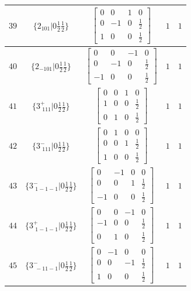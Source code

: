 \documentclass[fleqn,8pt]{jsarticle}
\begin{document}
\begin{longtable}{ccccc}
$ 39 $ & $ \{2{}_{101}|0 \frac{1}{2} \frac{1}{2}\} $ & $ \begin{bmatrix} 0 & 0 & 1 & 0 \\ 0 & -1 & 0 & \frac{1}{2} \\ 1 & 0 & 0 & \frac{1}{2} \end{bmatrix} $ & $ 1 $ & $ 1 $ \\ \hline
$ 40 $ & $ \{2{}_{-101}|0 \frac{1}{2} \frac{1}{2}\} $ & $ \begin{bmatrix} 0 & 0 & -1 & 0 \\ 0 & -1 & 0 & \frac{1}{2} \\ -1 & 0 & 0 & \frac{1}{2} \end{bmatrix} $ & $ 1 $ & $ 1 $ \\ \hline
$ 41 $ & $ \{3^{+}_{\,\,111}|0 \frac{1}{2} \frac{1}{2}\} $ & $ \begin{bmatrix} 0 & 0 & 1 & 0 \\ 1 & 0 & 0 & \frac{1}{2} \\ 0 & 1 & 0 & \frac{1}{2} \end{bmatrix} $ & $ 1 $ & $ 1 $ \\ \hline
$ 42 $ & $ \{3^{-}_{\,\,111}|0 \frac{1}{2} \frac{1}{2}\} $ & $ \begin{bmatrix} 0 & 1 & 0 & 0 \\ 0 & 0 & 1 & \frac{1}{2} \\ 1 & 0 & 0 & \frac{1}{2} \end{bmatrix} $ & $ 1 $ & $ 1 $ \\ \hline
$ 43 $ & $ \{3^{-}_{\,\,1-1-1}|0 \frac{1}{2} \frac{1}{2}\} $ & $ \begin{bmatrix} 0 & -1 & 0 & 0 \\ 0 & 0 & 1 & \frac{1}{2} \\ -1 & 0 & 0 & \frac{1}{2} \end{bmatrix} $ & $ 1 $ & $ 1 $ \\ \hline
$ 44 $ & $ \{3^{+}_{\,\,1-1-1}|0 \frac{1}{2} \frac{1}{2}\} $ & $ \begin{bmatrix} 0 & 0 & -1 & 0 \\ -1 & 0 & 0 & \frac{1}{2} \\ 0 & 1 & 0 & \frac{1}{2} \end{bmatrix} $ & $ 1 $ & $ 1 $ \\ \hline
$ 45 $ & $ \{3^{-}_{\,\,-11-1}|0 \frac{1}{2} \frac{1}{2}\} $ & $ \begin{bmatrix} 0 & -1 & 0 & 0 \\ 0 & 0 & -1 & \frac{1}{2} \\ 1 & 0 & 0 & \frac{1}{2} \end{bmatrix} $ & $ 1 $ & $ 1 $ \\ \hline

\end{longtable}
\end{document}
